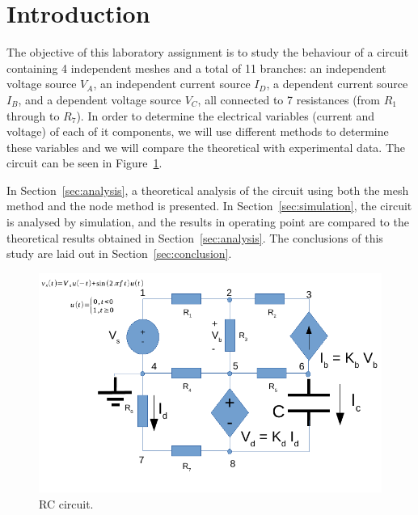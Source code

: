 \section{Introduction}
\label{sec:introduction}

The objective of this laboratory assignment is to study the behaviour of a circuit containing 4 independent meshes and a total of 11 branches: an independent voltage source $V_A$, an independent current source $I_D$, a dependent current source $I_B$, and a dependent voltage source $V_C$, all connected to 7 resistances (from $R_1$ through to $R_7$). In order to determine the electrical variables (current and voltage) of each of it components, we will use different methods to determine these variables and we will compare the theoretical with experimental data. The circuit can be seen in Figure~\ref{fig:rc}.

In Section~\ref{sec:analysis}, a theoretical analysis of the circuit using both the mesh method and the node method is
presented. In Section~\ref{sec:simulation}, the circuit is analysed by
simulation, and the results in operating point are compared to the theoretical results obtained in
Section~\ref{sec:analysis}. The conclusions of this study are laid out in
Section~\ref{sec:conclusion}.

\begin{figure}[h] \centering
\includegraphics[width=0.9\linewidth]{rc.pdf}
\caption{RC circuit.}
\label{fig:rc}
\end{figure}

